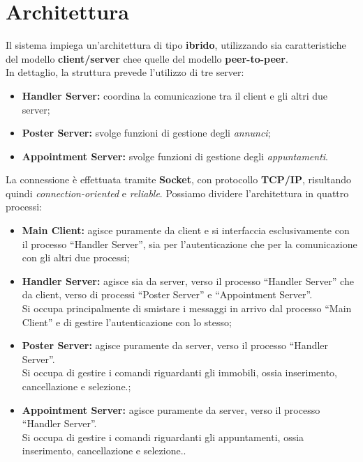 \chapter{Architettura}
\noindent Il sistema impiega un’architettura di tipo \textbf{ibrido}, utilizzando sia caratteristiche del modello \textbf{client/server} chee quelle del modello \textbf{peer-to-peer}.\\
In dettaglio, la struttura prevede l’utilizzo di tre server:
\begin{itemize}
    \item \textbf{Handler Server:} coordina la comunicazione tra il client e gli altri due server;
    \item \textbf{Poster Server:} svolge funzioni di gestione degli \textit{annunci};
    \item \textbf{Appointment Server:} svolge funzioni di gestione degli \textit{appuntamenti}.
\end{itemize}
La connessione è effettuata tramite \textbf{Socket}, con protocollo \textbf{TCP/IP}, risultando quindi \textit{connection-oriented} e \textit{reliable}.
Possiamo dividere l’architettura in quattro processi:
\begin{itemize}
    \item \textbf{Main Client:} agisce puramente da client e si interfaccia esclusivamente con il processo “Handler Server”, sia per l’autenticazione che per la comunicazione con gli altri due processi;
    \item \textbf{Handler Server:} agisce sia da server, verso il processo “Handler Server” che da client, verso di processi “Poster Server” e “Appointment Server”.\\
    Si occupa principalmente di smistare i messaggi in arrivo dal processo “Main Client” e di gestire l’autenticazione con lo stesso;
    \item \textbf{Poster Server:} agisce puramente da server, verso il processo “Handler Server”.\\
    Si occupa di gestire i comandi riguardanti gli immobili, ossia inserimento, cancellazione e selezione.;
    \item \textbf{Appointment Server:} agisce puramente da server, verso il processo “Handler Server”.\\
    Si occupa di gestire i comandi riguardanti gli appuntamenti, ossia inserimento, cancellazione e selezione..
\end{itemize}

